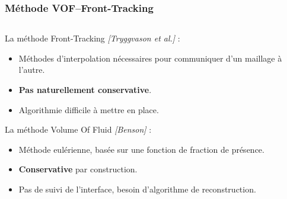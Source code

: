 \documentclass{beamer}
\newcommand{\bib}[1]{{\color{cea_texte!80}\tiny\textit{[#1]}}}
\begin{document}
\begin{frame}
    \frametitle{Méthode VOF--Front-Tracking}
    \footnotesize
    \begin{columns}[c]
    \begin{column}{0.6 \textwidth}
    \begin{ceablock}{La méthode Front-Tracking \bib{Tryggvason et al.} :}
        \begin{itemize}
            \item Méthodes d'interpolation nécessaires pour communiquer  d'un maillage à l'autre.
            \item \textbf{Pas naturellement conservative}.
            \item Algorithmie difficile à mettre en place.
        \end{itemize}
    \end{ceablock}
\begin{ceablock}{La méthode Volume Of Fluid \bib{Benson} :}
        \begin{itemize}
            \item Méthode eulérienne, basée sur une fonction de fraction de présence.
            \item \textbf{Conservative} par construction.
            \item Pas de suivi de l'interface, besoin d'algorithme de reconstruction.
            
        \end{itemize}
    \end{ceablock}
\end{column}
\begin{column}{0.4 \textwidth}
\begin{center}
		\begin{tikzpicture}[scale = 0.4, every node/.style={scale=0.4}]
			
		\end{tikzpicture}

\end{center}
\begin{center}
		\begin{tikzpicture}[scale = 0.4, every node/.style={scale=0.4}]
			
		\end{tikzpicture}

\end{center}
\end{column}
\end{columns}
\end{frame}
\end{document}

